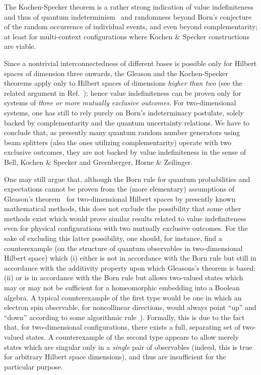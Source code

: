 \documentclass[%
 preprint,
 showpacs,
 showkeys,
 preprintnumbers,
 amsmath,amssymb,
 aps,
 prl,
  longbibliography,
 ]{revtex4-1}
\begin{document}
The Kochen-Specker theorem is a rather strong indication of value indefiniteness
and thus  of quantum indeterminism~\cite{2008-cal-svo} and randomness beyond Born's conjecture of the random occurrence of
individual events, and even beyond complementarity; at least for multi-context configurations where Kochen \& Specker constructions are viable.

Since a nontrivial interconnectedness of different bases
is possible only for Hilbert spaces of dimension three onwards,
the Gleason and the Kochen-Specker theorems apply only to Hilbert spaces
of dimensions {\em higher than two} (see the related argument in Ref.~\cite[p.~193]{peres}); hence value indefiniteness can be proven
only for systems of {\em three or more mutually exclusive outcomes}.
For two-dimensional systems, one has still to rely purely on Born's indeterminacy postulate,
solely backed by complementarity and the quantum uncertainty relations.
We have to conclude that,
as presently many  quantum random number generators using beam splitters (also the ones utilizing complementarity)
operate with two exclusive outcomes,
they are not backed by value indefiniteness in the sense of Bell, Kochen \& Specker and Greenberger, Horne \& Zeilinger.

One may still argue that, although the Born rule for quantum probabilities and expectations
cannot be proven from the (more elementary) assumptions of Gleason's theorem~\cite[\S~7.2]{peres}
for two-dimensional Hilbert spaces by presently known mathematical methods, this
does not exclude the possibility that some other methods exist which would  prove similar results
related to value indefiniteness even for physical configurations with two
mutually exclusive outcomes.
For the sake of excluding this latter possibility, one should,
for instance, find a counterexample
(on the structure of quantum observables in two-dimensional Hilbert space)
which
(i) either is not in accordance with the Born rule but still
in accordance with the additivity property upon which Gleasons's theorem is based;
(ii) or is in accordance with the Born rule but allows
two-valued states which may or may not be sufficient for a homeomorphic embedding into a Boolean algebra.
A typical counterexample of the first type
would be one in which an electron spin observable,
for noncollinear directions, would always point ``up'' and ``down'' according to some algorithmic
rule~\cite[pp.~70-72]{svozil-ql}).
Formally, this is due to the fact that, for two-dimensional configurations, there exists a
full, separating set of two-valued states.
A counterexample of the second type appears to allow merely states which
are singular only in a {\em single} pair of observables (indeed, this is true for arbitrary Hilbert space dimensions), and thus are insufficient for the particular purpose.
\end{document}
